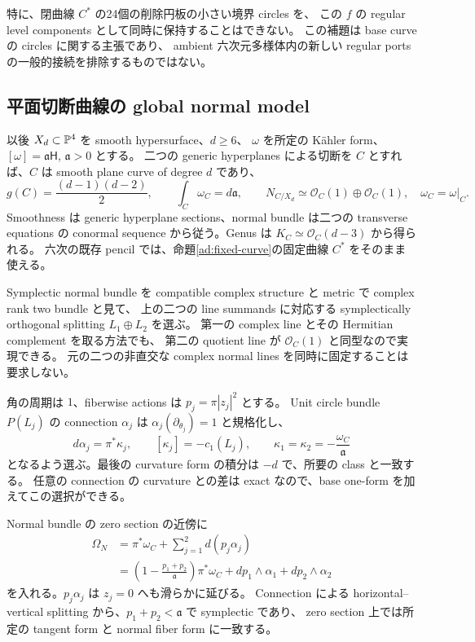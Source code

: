 特に、閉曲線 $C^*$ の24個の削除円板の小さい境界 circles を、
この $f$ の regular level components として同時に保持することはできない。
この補題は base curve の circles に関する主張であり、
ambient 六次元多様体内の新しい regular ports の一般的接続を排除するものではない。

\subsection{平面切断曲線の global normal model}

以後 $X_d\subset\mathbb P^4$ を smooth hypersurface、$d\ge6$、
$\omega$ を所定の K\"ahler form、$[\omega]=\mathfrak a\mathsf H$, $\mathfrak a>0$ とする。
二つの generic hyperplanes による切断を $C$ とすれば、$C$ は smooth plane curve of degree $d$ であり、
\begin{equation}\label{ncb:curve-data}
 g(C)=\frac{(d-1)(d-2)}2,\qquad
 \int_C\omega_C=d\mathfrak a,\qquad
 N_{C/X_d}\simeq\mathcal O_C(1)\oplus\mathcal O_C(1),
 \quad\omega_C=\omega|_C.
\end{equation}
Smoothness は generic hyperplane sections、normal bundle は二つの transverse equations の
conormal sequence から従う。Genus は $K_C\simeq\mathcal O_C(d-3)$ から得られる。
六次の既存 pencil では、命題\ref{ad:fixed-curve}の固定曲線 $C^*$ をそのまま使える。

Symplectic normal bundle を compatible complex structure と metric で complex rank two bundle と見て、
上の二つの line summands に対応する symplectically orthogonal splitting $L_1\oplus L_2$ を選ぶ。
第一の complex line とその Hermitian complement を取る方法でも、
第二の quotient line が $\mathcal O_C(1)$ と同型なので実現できる。
元の二つの非直交な complex normal lines を同時に固定することは要求しない。

角の周期は $1$、fiberwise actions は $p_j=\pi|z_j|^2$ とする。
Unit circle bundle $P(L_j)$ の connection $\alpha_j$ は
$\alpha_j(\partial_{\theta_j})=1$ と規格化し、
\begin{equation}\label{ncb:connections}
 d\alpha_j=\pi^*\kappa_j,
 \qquad [\kappa_j]=-c_1(L_j),
 \qquad \kappa_1=\kappa_2=-\frac{\omega_C}{\mathfrak a}
\end{equation}
となるよう選ぶ。最後の curvature form の積分は $-d$ で、所要の class と一致する。
任意の connection の curvature との差は exact なので、base one-form を加えてこの選択ができる。

Normal bundle の zero section の近傍に
\begin{equation}\label{ncb:omega}
 \begin{split}
 \Omega_N
 &=\pi^*\omega_C+\sum_{j=1}^2 d(p_j\alpha_j)\\
 &=\left(1-\frac{p_1+p_2}{\mathfrak a}\right)\pi^*\omega_C
       +dp_1\wedge\alpha_1+dp_2\wedge\alpha_2
 \end{split}
\end{equation}
を入れる。$p_j\alpha_j$ は $z_j=0$ へも滑らかに延びる。
Connection による horizontal--vertical splitting から、$p_1+p_2<\mathfrak a$ で symplectic であり、
zero section 上では所定の tangent form と normal fiber form に一致する。

